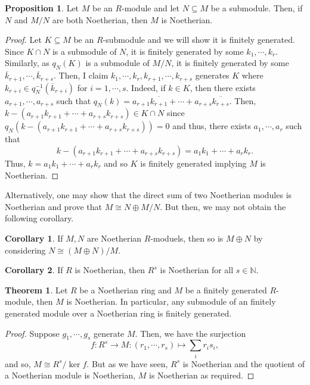 \documentclass[]{article}
\theoremstyle{definition}
\newtheorem{theorem}{Theorem}
\newtheorem{corollary}{Corollary}[theorem]
\theoremstyle{definition}
\newtheorem{proposition}{Proposition}[section]
\begin{document}
\begin{proposition}
  Let \(M\) be an \(R\)-module and let \(N \subseteq M\) be a submodule. Then, 
  if \(N\) and \(M / N\) are both Noetherian, then \(M\) is Noetherian.
\end{proposition}
\begin{proof}
  Let \(K \subseteq M\) be an \(R\)-submodule and we will show it is finitely 
  generated. Since \(K \cap N\) is a submodule of \(N\), it is finitely 
  generated by some \(k_1, \cdots, k_r\). Similarly, as \(q_N(K)\) 
  is a submodule of \(M / N\), it is finitely generated by some 
  \(\overline{k}_{r + 1}, \cdots, \overline{k}_{r + s}\). Then, I claim 
  \(k_1, \cdots, k_r, k_{r + 1}, \cdots, k_{r + s}\) generates \(K\) where 
  \(k_{r + i} \in q_N^{-1}(\overline{k}_{r + i})\) for \(i = 1, \cdots, s\).
  Indeed, if \(k \in K\), then there exists \(a_{r + 1}, \cdots, a_{r + s}\) 
  such that \(q_N(k) = a_{r + 1} \overline{k_{r + 1}} + 
    \cdots + a_{r + s} \overline{k_{r + s}}\).
  Then, \(k - (a_{r + 1} k_{r + 1} + \cdots + a_{r + s} k_{r + s}) \in K \cap N\)
  since \(q_N(k - (a_{r + 1} k_{r + 1} + \cdots + a_{r + s} k_{r + s})) = 0\) 
  and thus, there exists \(a_1, \cdots, a_r\) such that 
  \[k - (a_{r + 1} k_{r + 1} + \cdots + a_{r + s} k_{r + s}) = 
    a_1 k_1 + \cdots + a_r k_r.\]
  Thus, \(k = a_1 k_1 + \cdots + a_r k_r\) and so \(K\) is finitely generated 
  implying \(M\) is Noetherian.
\end{proof}

Alternatively, one may show that the direct sum of two Noetherian modules is 
Noetherian and prove that \(M \cong N \oplus M / N\). But then, we may not 
obtain the following corollary.

\begin{corollary}
  If \(M, N\) are Noetherian \(R\)-moduels, then so is \(M \oplus N\)
  by considering \(N \cong (M \oplus N) / M\).
\end{corollary}

\begin{corollary}
  If \(R\) is Noetherian, then \(R^s\) is Noetherian for all \(s \in \mathbb{N}\).
\end{corollary}

\begin{theorem}
  Let \(R\) be a Noetherian ring and \(M\) be a finitely generated \(R\)-module, 
  then \(M\) is Noetherian. In particular, any submodule of an finitely generated 
  module over a Noetherian ring is finitely generated.
\end{theorem}
\begin{proof}
  Suppose \(g_1, \cdots, g_s\) generate \(M\). Then, we have the surjection 
  \[f : R^s \to M : (r_1, \cdots, r_s) \mapsto \sum_i r_i s_i,\]
  and so, \(M \cong R^s / \ker f\). But as we have seen, \(R^s\) is Noetherian 
  and the quotient of a Noetherian module is Noetherian, \(M\) is Noetherian 
  as required.
\end{proof}
\end{document}
